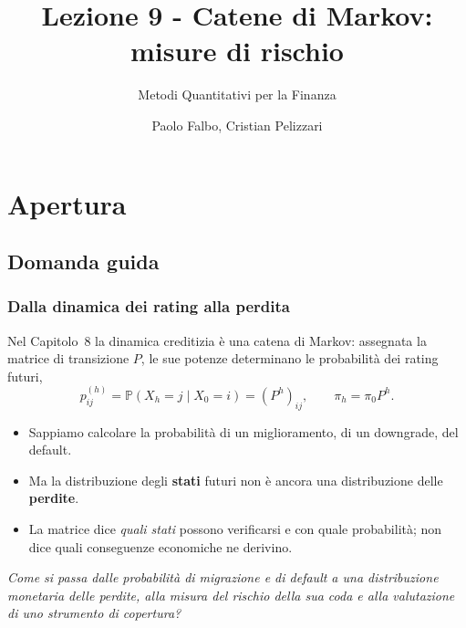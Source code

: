 \documentclass[handout]{beamer}%
\title[Catene di Markov: definizioni e propriet\`{a}]{Lezione 9 - Catene di Markov: misure di rischio}
\subtitle{Metodi Quantitativi per la Finanza}
\author[P. Falbo, C. Pelizzari]{{\LARGE Paolo Falbo, Cristian Pelizzari}}
\institute[]{{\large Dipartimento di Economia e Management}}
\date[]{}
\newenvironment{stepitemize}{\begin{itemize}[<+->]}{\end{itemize} }
\providecommand{\Prob}{\mathbb{P}}
\providecommand{\QTR}[2]{\csname #1\endcsname{#2}}
\begin{document}
\maketitle

\section{Apertura}


\subsection{Domanda guida}%

\begin{frame}%
%

\frametitle{Dalla dinamica dei rating alla perdita}%
%

%

Nel Capitolo~8 la dinamica creditizia \`{e} una catena di Markov: assegnata
la matrice di transizione $P$, le sue potenze determinano le
probabilit\`{a} dei rating futuri,
\[
p_{ij}^{(h)}=\Prob(X_h=j\mid X_0=i)=(P^h)_{ij},
\qquad
\pi_h=\pi_0P^h.
\]

\medskip

\begin{stepitemize}
\item Sappiamo calcolare la probabilit\`{a} di un miglioramento, di un
downgrade, del default.

\item Ma la distribuzione degli \textbf{stati} futuri non \`{e} ancora una
distribuzione delle \textbf{perdite}.

\item La matrice dice \emph{quali stati} possono verificarsi e con quale
probabilit\`{a}; non dice quali conseguenze economiche ne derivino.
\end{stepitemize}

\medskip

\begin{center}
{\small \emph{Come si passa dalle probabilit\`{a} di migrazione e di
default a una distribuzione monetaria delle perdite, alla misura del
rischio della sua coda e alla valutazione di uno strumento di
copertura?}}
\end{center}

\transboxout
\end{frame}%
\end{document}
